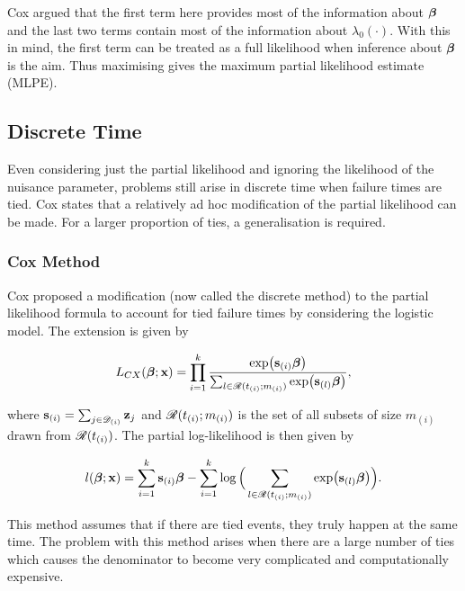 Cox  argued that the first term here provides most of the information about $\boldsymbol{\beta}$ and the last two terms contain most of the information about $\lambda_0(\cdot)$. With this in mind, the first term can be treated as a full likelihood when inference about $\boldsymbol{\beta}$ is the aim. Thus maximising  gives the maximum partial likelihood estimate (MLPE).

\subsection{Discrete Time}\label{discrete-time}

Even considering just the partial likelihood and ignoring the likelihood of the nuisance parameter, problems still arise in discrete time when failure times are tied. Cox  states that a relatively ad hoc modification of the partial likelihood can be made. For a larger proportion of ties, a generalisation is required.

\subsubsection{Cox Method}

Cox  proposed a modification (now called the discrete method) to the partial likelihood formula to account for tied failure times by considering the logistic model. The extension is given by

\begin{equation}
    L_{CX}(\boldsymbol{\beta};\textbf{x})=\prod_{i=1}^k\frac{\exp(\textbf{s}_{(i)}\boldsymbol{\beta})}{\sum_{l\in\mathscr{R}(t_{(i)};m_{(i)})}\exp(\textbf{s}_{(l)}\boldsymbol{\beta})},
\end{equation}

where $\textbf{s}_{(i)}=\sum_{j\in\mathscr{D}_{(i)}}\textbf{z}_j$ and $\mathscr{R}(t_{(i)};m_{(i)})$ is the set of all subsets of size $m_{(i)}$ drawn from $\mathscr{R}(t_{(i)})$. The partial log-likelihood is then given by

\begin{equation}
    l(\boldsymbol{\beta};\textbf{x})=\sum_{i=1}^k\textbf{s}_{(i)}\boldsymbol{\beta}-\sum_{i=1}^k\log\Big(\sum_{l\in\mathscr{R}(t_{(i)};m_{(i)})}\exp(\textbf{s}_{(l)}\boldsymbol{\beta})\Big).
\end{equation}

This method assumes that if there are tied events, they truly happen at the same time. The problem with this method arises when there are a large number of ties which causes the denominator to become very complicated and computationally expensive.

